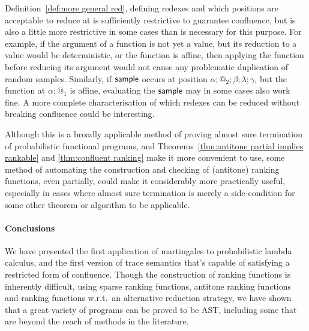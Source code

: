 Definition~\ref{def:more general red}, defining redexes and which positions are acceptable to reduce at is sufficiently restrictive to guarantee confluence, but is also a little more restrictive in some cases than is necessary for this purpose. For example, if the argument of a function is not yet a value, but its reduction to a value would be deterministic, or the function is affine, then applying the function before reducing its argument would not cause any problematic duplication of random samples. Similarly, if $\mathsf{sample}$ occurs at position $\alpha;@_2;\beta;\lambda;\gamma$, but the function at $\alpha;@_1$ is affine, evaluating the $\mathsf{sample}$ may in some cases also work fine. A more complete characterisation of which redexes can be reduced without breaking confluence could be interesting.

Although this is a broadly applicable method of proving almost sure termination of probabilistic functional programs, and Theorems~\ref{thm:antitone partial implies rankable} and \ref{thm:confluent ranking} make it more convenient to use, some method of automating the construction and checking of (antitone) ranking functions, even partially, could make it considerably more practically useful, especially in cases where almost sure termination is merely a side-condition for some other theorem or algorithm to be applicable.

\paragraph*{Conclusions}

We have presented the first application of martingales to probabilistic lambda calculus, and the first version of trace semantics that's capable of satisfying a restricted form of confluence.
Though the construction of ranking functions is inherently difficult, using sparse ranking functions, antitone ranking functions and ranking functions w.r.t.~an alternative reduction strategy, we have shown that a great variety of programs can be proved to be AST, including some that are beyond the reach of methods in the literature.

